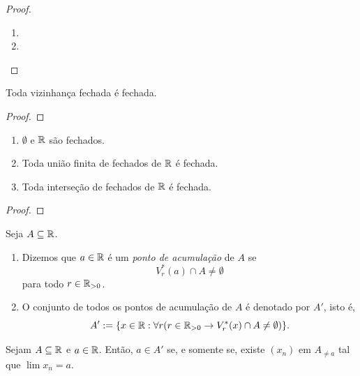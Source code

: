 \begin{proof}
    \leavevmode
        \begin{enumerate}[leftmargin=*, align=left, label=\textbf{(\alph*)}]
            \item \blackproof
            \item \blackproof
        \end{enumerate}
\end{proof}

\begin{proposition}
    Toda vizinhança fechada é fechada.
\end{proposition}

\begin{proof}
    \blackproof
\end{proof}

\begin{theorem}
    \leavevmode
        \begin{enumerate}[leftmargin=*, align=left, label=\textbf{(\alph*)}]
            \item $\emptyset$ e $\mathbb{R}$ são fechados.
            \item Toda união finita de fechados de $\mathbb{R}$ é fechada.
            \item Toda interseção de fechados de $\mathbb{R}$ é fechada.
        \end{enumerate}
\end{theorem}

\begin{proof}
    \blackproof
\end{proof}

\begin{definition}
    Seja $A \subseteq \mathbb{R}$.
        \begin{enumerate}[leftmargin=*, align=left, label=\textbf{(\alph*)}]
            \item Dizemos que $a \in \mathbb{R}$ é um \emph{ponto de acumulação} de $A$ se
                \[
                    V^*_r(a) \cap A \neq \emptyset
                \]
            para todo $r \in \mathbb{R}_{>0}$.
            \item O conjunto de todos os pontos de acumulação de $A$ é denotado por $A'$, isto é,
                \[
                    A' := \{x \in \mathbb{R} : \forall r (r \in \mathbb{R}_{>0} \rightarrow V^*_r(x) \cap A \neq \emptyset) \}.
                \]
        \end{enumerate}
\end{definition}

\begin{theorem} \label{teo.calc1:a_linha_sse_sequencia}
    Sejam $A \subseteq \mathbb{R}$ e $a \in \mathbb{R}$. Então, $a \in A'$ se, e somente se, existe $(x_n)$ em $A_{\neq a}$ tal que $\lim x_n = a$. 
\end{theorem}

